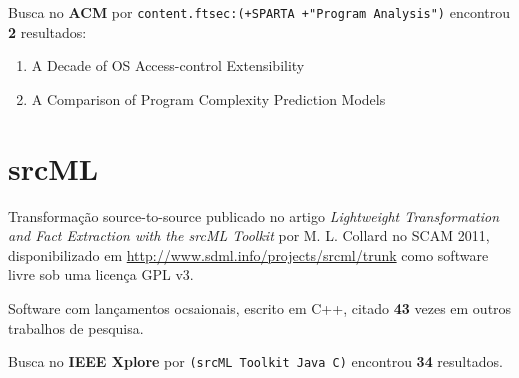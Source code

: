 Busca no {\bf ACM} por
\texttt{content.ftsec:(+SPARTA +"Program Analysis")}
encontrou {\bf 2}
resultados:

\begin{enumerate}
\item A Decade of OS Access-control Extensibility
\item A Comparison of Program Complexity Prediction Models
\end{enumerate}

\section{srcML}

Transformação source-to-source
publicado no artigo {\it Lightweight Transformation and Fact Extraction with the srcML Toolkit}
por M. L. Collard
no SCAM 2011,
disponibilizado em \url{http://www.sdml.info/projects/srcml/trunk}
como software livre
sob uma licença GPL v3.

Software com lançamentos ocsaionais,
escrito em C++,
citado {\bf 43} vezes em outros trabalhos de pesquisa.

Busca no {\bf IEEE Xplore} por
\texttt{(srcML Toolkit Java C)}
encontrou {\bf 34}
resultados.


